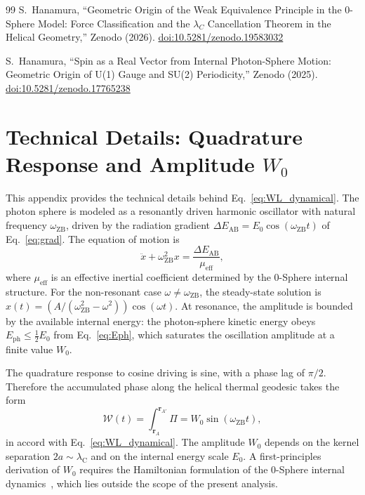 \documentclass[%
 reprint, amsmath,amssymb, aps, prb, ]{revtex4-2}
\numberwithin{equation}{section}
\newcommand{\omZB}{\omega_{\text{ZB}}}
\newcommand{\EphS}{E_{\text{ph}}}
\newcommand{\Egrad}{\Delta E_{\text{AB}}}
\newcommand{\WL}{\mathcal{W}}
\newcommand{\lambdaC}{\lambda_{\mathrm{C}}}
\begin{document}
\begin{thebibliography}{99}
S.~Hanamura, ``Geometric Origin of the Weak Equivalence Principle in the 0-Sphere Model: Force Classification and the $\lambda_C$ Cancellation Theorem in the Helical Geometry,'' Zenodo (2026). \href{https://doi.org/10.5281/zenodo.19583032}{doi:10.5281/zenodo.19583032}

S.~Hanamura, ``Spin as a Real Vector from Internal Photon-Sphere Motion: Geometric Origin of U(1) Gauge and SU(2) Periodicity,'' Zenodo (2025). \href{https://doi.org/10.5281/zenodo.17765238}{doi:10.5281/zenodo.17765238}

\end{thebibliography}

\appendix

\section{Technical Details: Quadrature Response and Amplitude $W_0$}
\label{app:technical}

This appendix provides the technical details behind Eq.~\eqref{eq:WL_dynamical}. The photon sphere is modeled as a resonantly driven harmonic oscillator with natural frequency $\omZB$, driven by the radiation gradient $\Egrad = E_0 \cos(\omZB t)$ of Eq.~\eqref{eq:grad}. The equation of motion is
\begin{equation}
\ddot{x} + \omZB^2 x = \frac{\Egrad}{\mu_{\text{eff}}},
\label{eq:osc_eqn}
\end{equation}
where $\mu_{\text{eff}}$ is an effective inertial coefficient determined by the 0-Sphere internal structure. For the non-resonant case $\omega \neq \omZB$, the steady-state solution is $x(t) = (A/(\omZB^2 - \omega^2))\cos(\omega t)$. At resonance, the amplitude is bounded by the available internal energy: the photon-sphere kinetic energy obeys $\EphS \leq \tfrac{1}{2}E_0$ from Eq.~\eqref{eq:Eph}, which saturates the oscillation amplitude at a finite value $W_0$.

The quadrature response to cosine driving is sine, with a phase lag of $\pi/2$. Therefore the accumulated phase along the helical thermal geodesic takes the form
\begin{equation}
\WL(t) = \int_{\mathbf{r}_A}^{\mathbf{r}_{A'}} \Pi = W_0 \sin(\omZB t),
\label{eq:WL_app}
\end{equation}
in accord with Eq.~\eqref{eq:WL_dynamical}. The amplitude $W_0$ depends on the kernel separation $2a \sim \lambdaC$ and on the internal energy scale $E_0$. A first-principles derivation of $W_0$ requires the Hamiltonian formulation of the 0-Sphere internal dynamics~\cite{hanamura01}, which lies outside the scope of the present analysis.
\end{document}
